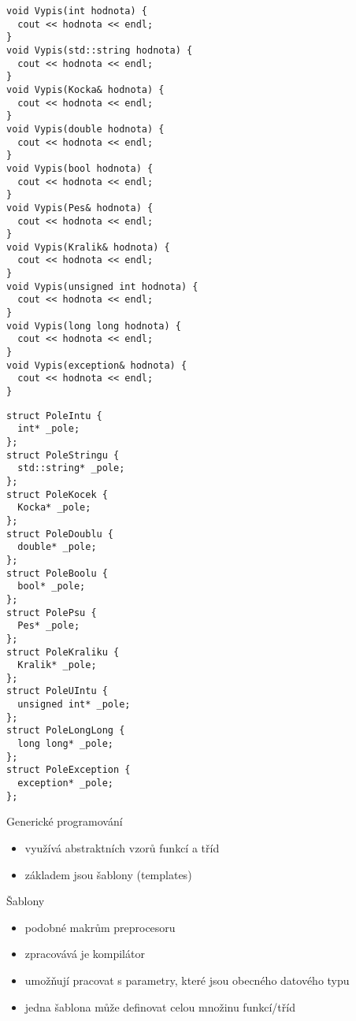 \begin{frame}[fragile]
\begin{twocols}
\begin{lstlisting}[basicstyle=\scriptsize]
void Vypis(int hodnota) {
  cout << hodnota << endl;
}
void Vypis(std::string hodnota) {
  cout << hodnota << endl;
}
void Vypis(Kocka& hodnota) {
  cout << hodnota << endl;
}
void Vypis(double hodnota) {
  cout << hodnota << endl;
}
void Vypis(bool hodnota) {
  cout << hodnota << endl;
}
void Vypis(Pes& hodnota) {
  cout << hodnota << endl;
}
void Vypis(Kralik& hodnota) {
  cout << hodnota << endl;
}
void Vypis(unsigned int hodnota) {
  cout << hodnota << endl;
}
void Vypis(long long hodnota) {
  cout << hodnota << endl;
}
void Vypis(exception& hodnota) {
  cout << hodnota << endl;
}
\end{lstlisting}

\twocolssep

\begin{lstlisting}[basicstyle=\scriptsize]
struct PoleIntu {
  int* _pole;
};
struct PoleStringu {
  std::string* _pole;
};
struct PoleKocek {
  Kocka* _pole;
};
struct PoleDoublu {
  double* _pole;
};
struct PoleBoolu {
  bool* _pole;
};
struct PolePsu {
  Pes* _pole;
};
struct PoleKraliku {
  Kralik* _pole;
};
struct PoleUIntu {
  unsigned int* _pole;
};
struct PoleLongLong {
  long long* _pole;
};
struct PoleException {
  exception* _pole;
};
\end{lstlisting}

\end{twocols}
\end{frame}












\begin{frame}[fragile]
\begin{block}{Generické programování}
\begin{itemize}
\item využívá abstraktních vzorů funkcí a tříd
\item základem jsou šablony (templates)
\end{itemize}
\end{block}

\begin{block}{Šablony}
\begin{itemize}
\item podobné makrům preprocesoru
\item zpracovává je kompilátor
\item umožňují pracovat s parametry, které jsou obecného datového typu
\item jedna šablona může definovat celou množinu funkcí/tříd
\end{itemize}
\end{block}
\end{frame}



